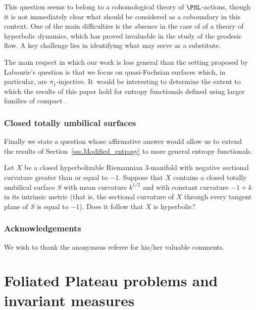 This question seems to belong to a cohomological theory of $\PSL$-actions, though it is not immediately clear what should be considered as a coboundary in this context. One of the main difficulties is the absence in the case of \ksurfaces of a theory of hyperbolic dynamics, which has proved invaluable in the study of the geodesic flow. A key challenge lies in identifying what may serve as a substitute.

The main respect in which our work is less general than the setting proposed by Labourie's question is that we focus on quasi-Fuchsian surfaces which, in particular, are $\pi_1$-injective. It~would be interesting to determine the extent to which the results of this paper hold for entropy functionals defined using larger families of compact \ksurfaces.

\subsubsection{Closed totally umbilical surfaces}

Finally we state a question whose affirmative answer would allow us to extend the results of Section~\ref{sss.Modified_entropy} to more general entropy functionals.

\begin{question} \label{question:intro}
Let $X$ be a closed hyperbolizable Riemannian 3-manifold with negative sectional curvature greater than or equal to $-1$. Suppose that $X$ contains a closed totally umbilical surface $S$ with mean curvature $k^{1/2}$ and with constant curvature $-1+k$ in its intrinsic metric (that is, the sectional curvature of $X$ through every tangent plane of $S$ is equal to $-1$). Does it follow that $X$ is hyperbolic?
\end{question}

\subsubsection*{Acknowledgements}
We wish to thank the anonymous referee for his/her valuable comments.

\section{Foliated Plateau problems and invariant measures}

\label{ss.as_Plateau}

